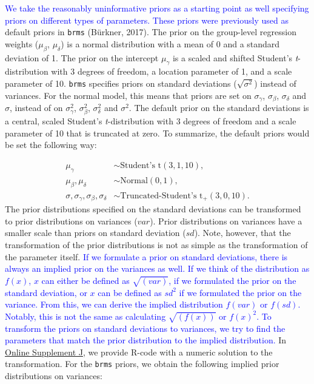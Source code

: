 \documentclass[
  english,
  doc,floatsintext]{apa6}
\begin{document}
\textcolor{blue}{We take the reasonably uninformative priors as a starting point as well specifying priors on different types of parameters. These priors were previously used as} default priors in \texttt{brms} (Bürkner, 2017). The prior on the group-level regression weights (\(\mu_{\beta}\), \(\mu_{\delta}\)) is a normal distribution with a mean of 0 and a standard deviation of 1. The prior on the intercept \(\mu_{\gamma}\) is a scaled and shifted Student's \emph{t}-distribution with 3 degrees of freedom, a location parameter of 1, and a scale parameter of 10. \texttt{brms} specifies priors on standard deviations (\(\sqrt{\sigma^2}\)) instead of variances. For the normal model, this means that priors are set on \(\sigma_{\gamma}\), \(\sigma_{\beta}\), \(\sigma_{\delta}\) and \(\sigma\), instead of on \(\sigma_{\gamma}^2\), \(\sigma_{\beta}^2\), \(\sigma_{\delta}^2\) and \(\sigma^2\). The default prior on the standard deviations is a central, scaled Student's \emph{t}-distribution with 3 degrees of freedom and a scale parameter of 10 that is truncated at zero. To summarize, the default priors would be set the following way:

\begin{equation}
\begin{aligned}
\mu_{\gamma} &\sim \text{Student's t}(3, 1, 10), \label{eq:chosenpriors1} \\ 
\mu_{\beta}, \mu_{\delta} &\sim \text{Normal}(0, 1), \\ 
\sigma, \sigma_{\gamma}, \sigma_{\beta}, \sigma_{\delta} &\sim \text{Truncated-Student's t}_{+}(3, 0, 10). 
\end{aligned}
\end{equation}
The prior distributions specified on the standard deviations can be transformed to prior distributions on variances (\(var\)). Prior distributions on variances have a smaller scale than priors on standard deviation (\(sd\)). Note, however, that the transformation of the prior distributions is not as simple as the transformation of the parameter itself. \textcolor{blue}{If we formulate a prior on standard deviations, there is always an implied prior on the variances as well. If we think of the distribution as $f(x)$, $x$ can either be defined as $\sqrt{(var)}$, if we formulated the prior on the standard deviation, or $x$ can be defined as ${sd}^2$ if we formulated the prior on the variance. From this, we can derive the implied distribution $f(var)$ or $f(sd)$. Notably, this is not the same as calculating $\sqrt{(f(x))}$ or $f(x)^2$. To transform the priors on standard deviations to variances, we try to find the parameters that match the prior distribution to the implied distribution.} In \href{https://github.com/MyrtheV/Bayesian-Hierarchical-Modelling-An-Introduction-and-Reassessment/tree/main/R\%20code/Prior\%20transformation}{Online Supplement J}, we provide R-code with a numeric solution to the transformation. For the \texttt{brms} priors, we obtain the following implied prior distributions on variances:
\end{document}

